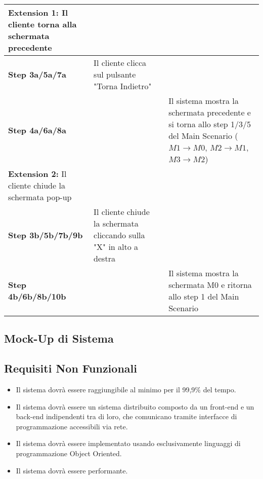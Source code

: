 \begin{longtable}{|m{4cm}|m{4cm}|m{3cm}|m{4cm}|}
    \hline
        \textbf{Extension 1:} \newline  Il cliente torna alla schermata precedente & & &\\
        \hline
        \textbf{Step 3a/5a/7a} & Il cliente clicca sul pulsante "Torna Indietro"& & \\
        \hline
        \textbf{Step 4a/6a/8a} & & & Il sistema mostra la schermata precedente e si torna allo step 1/3/5 del Main Scenario ($M1 \to M0$, $M2 \to M1$, $M3 \to M2$) \\
        \hline
        \textbf{Extension 2:} \newline Il cliente chiude la schermata pop-up & & &\\
        \hline
        \textbf{Step 3b/5b/7b/9b} & Il cliente chiude la schermata cliccando sulla "X" in alto a destra & &\\
        \hline
        \textbf{Step 4b/6b/8b/10b} & & & Il sistema mostra la schermata M0 e ritorna allo step 1 del Main Scenario \\
        \hline
    \end{longtable}
        \subsection{Mock-Up di Sistema}
        \subsection{Requisiti Non Funzionali}
            \begin{itemize}
                \item Il sistema dovrà essere raggiungibile al minimo per il 99,9\% del tempo.
                \item Il sistema dovrà essere un sistema distribuito composto da un front-end e un back-end indipendenti tra di loro, che comunicano tramite interfacce di programmazione accessibili via rete.
                \item Il sistema dovrà essere implementato usando esclusivamente linguaggi di programmazione Object Oriented.
                \item Il sistema dovrà essere performante.
        
            \end{itemize}


    

    
\hfill



